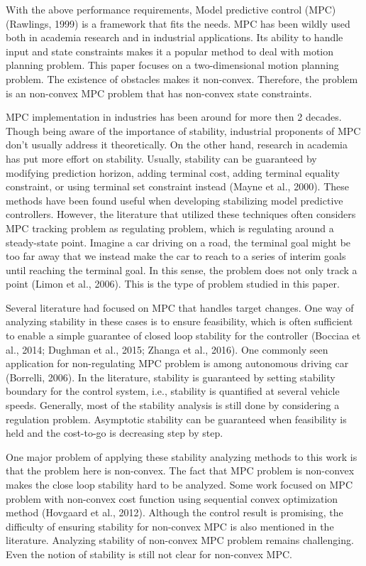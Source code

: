 \documentclass{ifacconf}
\begin{document}
With the above performance requirements, Model predictive control (MPC) (Rawlings, 1999) is a framework that fits the needs. MPC has been wildly used both in academia research and in industrial applications. Its ability to handle input and state constraints makes it a popular method to deal with motion planning problem. 
This paper focuses on a two-dimensional motion planning problem. %
The existence of obstacles makes it non-convex. Therefore, the problem is an non-convex MPC problem that has non-convex state constraints. 

MPC implementation in industries has been around for more then 2 decades. Though being aware of the importance of stability, industrial proponents of MPC don't usually address it theoretically. On the other hand, research in academia has put more effort on stability. Usually, stability can be guaranteed by modifying prediction horizon, adding terminal cost, adding terminal equality constraint, or using terminal set constraint instead (Mayne et al., 2000). These methods have been found useful when developing stabilizing model predictive controllers. However, the literature that utilized these techniques often considers MPC tracking problem as regulating problem, which is regulating around a steady-state point. Imagine a car driving on a road, the terminal goal might be too far away that we instead make the car to reach to a series of interim goals until reaching the terminal goal. In this sense, the problem does not only track a point (Limon et al., 2006). This is the type of problem studied in this paper.

Several literature had focused on MPC that handles target changes. One way of analyzing stability in these cases is to ensure feasibility, which is often sufficient to enable a simple guarantee of closed loop stability for the controller (Bocciaa et al., 2014; Dughman et al., 2015; Zhanga et al., 2016). One commonly seen application for non-regulating MPC problem is among autonomous driving car (Borrelli, 2006). In the literature, stability is guaranteed by setting stability boundary for the control system, i.e., stability is quantified at several vehicle speeds. Generally, most of the stability analysis is still done by considering a regulation problem. Asymptotic stability can be guaranteed when feasibility is held and the cost-to-go is decreasing step by step.

One major problem of applying these stability analyzing methods to this work is that the problem here is non-convex. The fact that MPC problem is non-convex makes the close loop stability hard to be analyzed. Some work focused on MPC problem with non-convex cost function using sequential convex optimization method (Hovgaard et al., 2012). Although the control result is promising, the difficulty of ensuring stability for non-convex MPC is also mentioned in the literature. 
Analyzing stability of non-convex MPC problem remains challenging. Even the notion of stability is still not clear for non-convex MPC.
\end{document}
